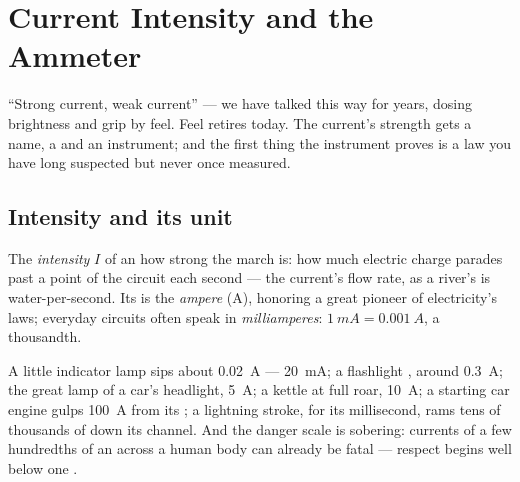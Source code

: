 \chapter{Current Intensity and the Ammeter}\label{ch:g8:intensity-ammeter}

``Strong current, weak current'' --- we have talked this way for
years, dosing brightness and grip by feel. Feel retires today.
The current's strength gets a name, a  and an instrument;
and the first thing the instrument proves is a law you have
long suspected but never once measured.

\section{Intensity and its unit}

\begin{definition}[Intensity]\label{def:g8:intensity-ammeter:intensity}
The \emph{intensity} $I$ of an 
 how strong the march is: how much electric charge
parades past a point of the circuit each second --- the
current's flow rate, as a river's is water-per-second. Its 
is the \emph{ampere} (\unit{A}), honoring a great
pioneer of electricity's laws; everyday circuits often speak in
\emph{milliamperes}: $\qty{1}{mA} = \qty{0.001}{A}$, a
thousandth.
\end{definition}

\begin{example}\label{ex:g8:intensity-ammeter:values}
A little indicator lamp sips about \qty{0.02}{A} ---
\qty{20}{mA}; a flashlight , around \qty{0.3}{A}; the great
lamp of a car's headlight, \qty{5}{A}; a kettle at full roar,
\qty{10}{A}; a starting car engine gulps \qty{100}{A} from its
; a lightning stroke, for its millisecond, rams tens of
thousands of  down its channel. And the danger scale is
sobering: currents of a few hundredths of an  across a
human body can already be fatal --- respect begins well below
one .
\end{example}

